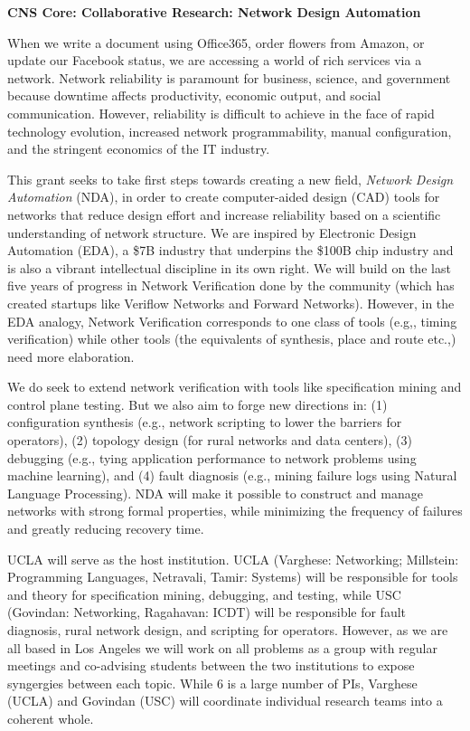 \documentclass[10pt]{article}
\begin{document}
%
\centerline{\large\textbf{CNS Core: Collaborative Research: Network Design Automation}}
\bigskip

When we write a document using Office365, order flowers from Amazon, or update our Facebook status, we are accessing a world of rich services via a network. Network reliability is paramount for business, science, and government because downtime affects productivity, economic output, and social communication. However, reliability is difficult to achieve in the face of rapid technology evolution, increased network programmability, manual configuration, and the stringent economics of the IT industry.

This grant seeks to take first steps towards creating a new field, \emph{Network Design Automation} (NDA), in order to create computer-aided design (CAD) tools for networks  that reduce design effort and increase reliability based on a scientific understanding of network structure. We are inspired by Electronic Design Automation (EDA), a \$7B industry that underpins the \$100B chip industry and is also a vibrant intellectual discipline in its own right.  We will build on 
the last five years of progress in Network Verification done by the community (which has created startups like
Veriflow Networks and Forward Networks).  However, in the EDA analogy, Network Verification corresponds to one class 
of tools (e.g,, timing verification) while other tools (the equivalents of synthesis, place and route etc.,) need more 
elaboration.  

We do seek to extend network verification with tools like specification mining
and control plane testing. But we also aim to forge new directions in: (1) configuration synthesis (e.g.,  network scripting to lower the barriers for operators),  (2) topology design (for rural networks and data centers), (3) debugging (e.g., tying application performance to network problems using machine learning), and (4) fault diagnosis (e.g., mining failure logs using Natural Language Processing).  NDA will make it possible to construct and manage networks with strong formal properties, while minimizing the frequency of failures and greatly reducing recovery time.

UCLA will serve as the host institution. UCLA (Varghese: Networking; Millstein: Programming Languages, Netravali, Tamir: Systems) will be responsible for tools and theory for specification mining, debugging, and testing, while USC  (Govindan: Networking, Ragahavan: ICDT) will be responsible for fault diagnosis, rural network design, and scripting for operators.  However, as we are all based in Los Angeles we will work on all problems as a group with regular meetings and co-advising students between the two institutions to expose syngergies between each topic.  While 6 is a large number of PIs, Varghese (UCLA) and Govindan (USC) will coordinate individual research teams into a coherent whole.
\end{document}
